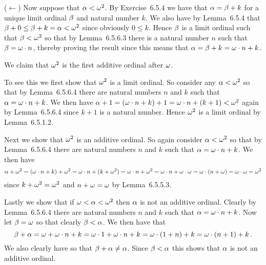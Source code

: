 \begin{solution}
{        ($\leftarrow$) Now suppose that $\alpha < \omega^2$.
        By Exercise~6.5.4 we have that $\alpha = \beta + k$ for a unique limit ordinal $\beta$ and natural number $k$.
        We also have by Lemma~6.5.4 that $\beta + 0 \leq \beta + k = \alpha < \omega^2$ since obviously $0 \leq k$.
        Hence $\beta$ is a limit ordinal such that $\beta < \omega^2$ so that by Lemma~6.5.6.3 there is a natural number $n$ such that $\beta = \omega \cdot n$, thereby proving the result since this means that $\alpha = \beta + k = \omega \cdot n + k$. \qedsymbol
    }
    
    \mainprob

    We claim that $\omega^2$ is the first additive ordinal after $\omega$.

    To see this we first show that $\omega^2$ is a limit ordinal.
    So consider any $\alpha < \omega^2$ so that by Lemma~6.5.6.4 there are natural numbers $n$ and $k$ such that $\alpha = \omega \cdot n + k$.
    We then have $\alpha + 1 = (\omega \cdot n + k) + 1 = \omega \cdot n + (k+1) < \omega^2$ again by Lemma~6.5.6.4 since $k+1$ is a natural number.
    Hence $\omega^2$ is a limit ordinal by Lemma~6.5.1.2.

    Next we show that $\omega^2$ is an additive ordinal.
    So again consider $\alpha < \omega^2$ so that by Lemma~6.5.6.4 there are natural numbers $n$ and $k$ such that $\alpha = \omega \cdot n + k$.
    We then have
    $$
    \alpha + \omega^2 = (\omega \cdot n + k) + \omega^2 = \omega \cdot n + (k + \omega^2) = \omega \cdot n + \omega^2 = \omega \cdot n + \omega \cdot \omega
    = \omega \cdot (n + \omega) = \omega \cdot \omega = \omega^2
    $$
    since $k + \omega^2 = \omega^2$ and $n + \omega = \omega$ by Lemma~6.5.5.3.

    Lastly we show that if $\omega < \alpha < \omega^2$ then $\alpha$ is not an additive ordinal.
    Clearly by Lemma~6.5.6.4 there are natural numbers $n$ and $k$ such that $\alpha = \omega \cdot n + k$.
    Now let $\beta = \omega$ so that clearly $\beta < \alpha$.
    We then have that
    $$
    \beta + \alpha = \omega + \omega \cdot n + k = \omega \cdot 1 + \omega \cdot n + k = \omega \cdot (1 + n) + k = \omega \cdot (n+1) + k \,.
    $$
    We also clearly have
    so that $\beta + \alpha \neq \alpha$.
    Since $\beta < \alpha$ this shows that $\alpha$ is not an additive ordinal. \qedsymbol
\end{solution}


